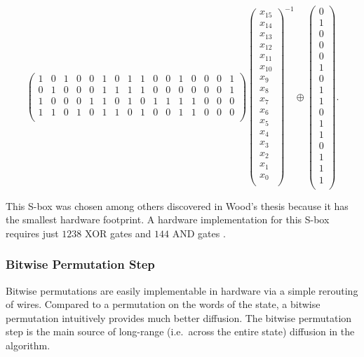 \begin{equation*}
\begin{pmatrix}
1 & 0 & 1 & 0 & 0 & 1 & 0 & 1 & 1 & 0 & 0 & 1 & 0 & 0 & 0 & 1 \\
0 & 1 & 0 & 0 & 0 & 1 & 1 & 1 & 1 & 0 & 0 & 0 & 0 & 0 & 0 & 1 \\
1 & 0 & 0 & 0 & 1 & 1 & 0 & 1 & 0 & 1 & 1 & 1 & 1 & 0 & 0 & 0 \\
1 & 1 & 0 & 1 & 0 & 1 & 1 & 0 & 1 & 0 & 0 & 1 & 1 & 0 & 0 & 0 \\
\end{pmatrix}
\begin{pmatrix}
x_{15} \\
x_{14} \\
x_{13} \\
x_{12} \\
x_{11} \\
x_{10} \\
x_{9} \\
x_{8} \\
x_{7} \\
x_{6} \\
x_{5} \\
x_{4} \\
x_{3} \\
x_{2} \\
x_{1} \\
x_{0} \\
\end{pmatrix}
^{-1}
\oplus
\begin{pmatrix}
0 \\
1 \\
0 \\
0 \\
0 \\
1 \\
0 \\
1 \\
1 \\
0 \\
1 \\
1 \\
0 \\
1 \\
1 \\
1 \\
\end{pmatrix}.
\end{equation*}

This S-box was chosen among others discovered in Wood's thesis because it has the smallest hardware footprint.
A hardware implementation for this S-box requires just $1238$ XOR gates and $144$ AND gates \cite{Wood2013_SboxThesis}.

\subsubsection{Bitwise Permutation Step}
Bitwise permutations are easily implementable in hardware via a simple rerouting of wires.
Compared to a permutation on the words of the state, a bitwise permutation intuitively provides much better diffusion.
The bitwise permutation step is the main source of long-range (i.e.\ across the entire state) diffusion in the algorithm.

